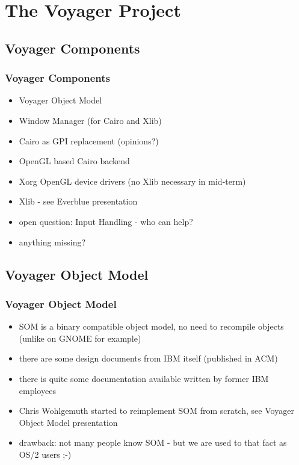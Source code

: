 \documentclass{beamer}
\begin{document}
\section{The Voyager Project}
\subsection{Voyager Components}
\begin{frame}
\frametitle{Voyager Components}
\begin{itemize}
  \item Voyager Object Model
  \item Window Manager (for Cairo and Xlib)
  \item Cairo as GPI replacement (opinions?)
  \item OpenGL based Cairo backend
  \item Xorg OpenGL device drivers (no Xlib necessary in mid-term)
  \item Xlib - see Everblue presentation
  \item open question: Input Handling - who can help?
  \item anything missing?
\end{itemize}
\end{frame}

\subsection{Voyager Object Model}
\begin{frame}
\frametitle{Voyager Object Model}
\begin{itemize}
  \item SOM is a binary compatible object model, no need to recompile objects (unlike on GNOME for example)
  \item there are some design documents from IBM itself (published in ACM)
  \item there is quite some documentation available written by former IBM employees
  \item Chris Wohlgemuth started to reimplement SOM from scratch, see Voyager Object Model presentation
  \item drawback: not many people know SOM - but we are used to that fact as OS/2 users ;-)
\end{itemize}
\end{frame}
\end{document}
